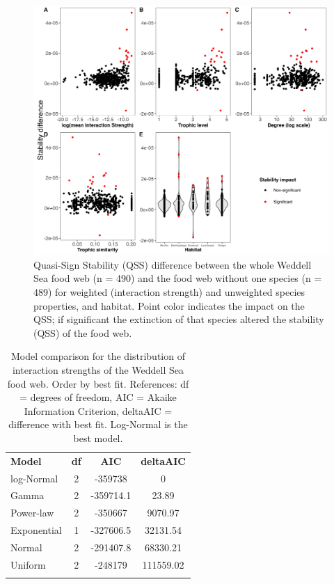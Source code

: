 \documentclass[gc, manuscript]{copernicus}
\begin{document}
\clearpage

\begin{figure}
\includegraphics[width=12cm]{Fig.5_QSSDif} \caption{Quasi-Sign Stability (QSS) difference between the whole Weddell Sea food web (n = 490) and the food web without one species (n = 489) for weighted (interaction strength) and unweighted species properties, and habitat. Point color indicates the impact on the QSS; if significant the extinction of that species altered the stability (QSS) of the food web.}\label{fig:unnamed-chunk-5}
\end{figure}

\clearpage

\begin{table}[t]
\caption{Model comparison for the distribution of interaction strengths of the Weddell Sea food web. Order by best fit. References: df = degrees of freedom, AIC = Akaike Information Criterion, deltaAIC = difference with best fit. Log-Normal is the best model.}
\begin{tabular}{l c c c}
\tophline

\textbf{Model} & \textbf{df} & \textbf{AIC} & \textbf{deltaAIC} \\
\middlehline
log-Normal & 2 & -359738 & 0 \\
\middlehline
Gamma & 2 & -359714.1 & 23.89 \\
\middlehline
Power-law & 2 & -350667 & 9070.97 \\
\middlehline
Exponential & 1 & -327606.5 & 32131.54 \\
\middlehline
Normal & 2 & -291407.8 & 68330.21 \\
\middlehline
Uniform & 2 & -248179 & 111559.02 \\

\bottomhline
\end{tabular}
\end{table}
\end{document}
